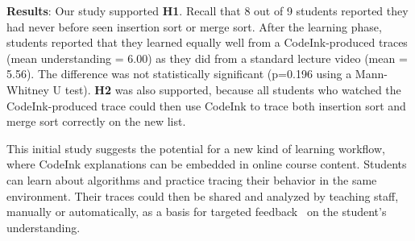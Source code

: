 
\noindent \textbf{Results}: Our study supported \textbf{H1}. Recall that
8 out of 9 students reported they had never before seen insertion sort
or merge sort. After the learning phase, students reported that they
learned equally well from a CodeInk-produced traces (mean understanding
= 6.00) as they did from a standard lecture video (mean = 5.56). The
difference was not statistically significant (p=0.196 using a
Mann-Whitney U test). \textbf{H2} was also supported, because all
students who watched the CodeInk-produced trace could then use CodeInk
to trace both insertion sort and merge sort correctly on the new list.



This initial study suggests the potential for a new kind of learning
workflow, where CodeInk explanations can be embedded in online course
content. Students can learn about algorithms and practice tracing their
behavior in the same environment. Their traces could then be shared and
analyzed by teaching staff, manually or automatically, as a basis for
targeted feedback~\cite{Balzer1989} on the student's understanding.

